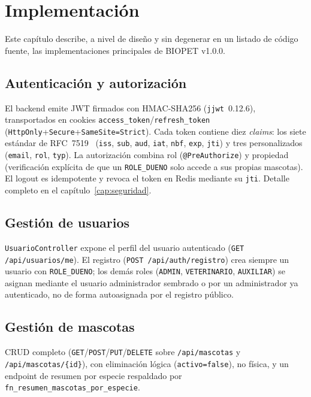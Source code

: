 \chapter{Implementaci\'on}
\label{cap:implementacion}

Este cap\'itulo describe, a nivel de dise\~no y sin degenerar en un listado
de c\'odigo fuente, las implementaciones principales de BIOPET v1.0.0.

\section{Autenticaci\'on y autorizaci\'on}

El backend emite JWT firmados con HMAC-SHA256 (\texttt{jjwt}~0.12.6),
transportados en cookies \texttt{access\_token}/\texttt{refresh\_token}
(\texttt{HttpOnly}+\texttt{Secure}+\texttt{SameSite=Strict}). Cada token
contiene diez \emph{claims}: los siete est\'andar de RFC~7519~\cite{rfc7519}
(\texttt{iss}, \texttt{sub}, \texttt{aud}, \texttt{iat}, \texttt{nbf},
\texttt{exp}, \texttt{jti}) y tres personalizados (\texttt{email},
\texttt{rol}, \texttt{typ}). La autorizaci\'on combina rol
(\texttt{@PreAuthorize}) y propiedad (verificaci\'on expl\'icita de que un
\texttt{ROLE\_DUENO} solo accede a sus propias mascotas). El logout es
idempotente y revoca el token en Redis mediante su \texttt{jti}. Detalle
completo en el cap\'itulo~\ref{cap:seguridad}.

\section{Gesti\'on de usuarios}

\texttt{UsuarioController} expone el perfil del usuario autenticado
(\texttt{GET /api/usuarios/me}). El registro (\texttt{POST
/api/auth/registro}) crea siempre un usuario con \texttt{ROLE\_DUENO}; los
dem\'as roles (\texttt{ADMIN}, \texttt{VETERINARIO}, \texttt{AUXILIAR}) se
asignan mediante el usuario administrador sembrado o por un administrador
ya autenticado, no de forma autoasignada por el registro p\'ublico.

\section{Gesti\'on de mascotas}

CRUD completo (\texttt{GET}/\texttt{POST}/\texttt{PUT}/\texttt{DELETE}
sobre \texttt{/api/mascotas} y \texttt{/api/mascotas/\{id\}}), con
eliminaci\'on l\'ogica (\texttt{activo=false}), no f\'isica, y un endpoint
de resumen por especie respaldado por \texttt{fn\_resumen\_mascotas\_por\_especie}.

